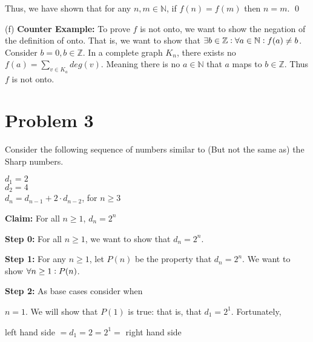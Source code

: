 \documentclass{article}
\begin{document}
Thus, we have shown that for any $n,m\in\mathbb{N}$, if $f(n)=f(m)$ then $n=m$. \qed\vspace{15pt}

(f)
\textbf{Counter Example:} To prove $f$ is not onto, we want to show the negation of the definition of onto. That is, we want to show that $\exists b\in\mathbb{Z}\vcentcolon \forall a\in\mathbb{N}\vcentcolon f(a)\neq b$. Consider $b=0,b\in\mathbb{Z}$.  In a complete graph $K_n$, there exists no $f(a)=\sum_{v\in K_a} deg(v)$.  Meaning there is no $a\in\mathbb{N}$ that $a$ maps to $b\in\mathbb{Z}$.  Thus $f$ is not onto. \vspace{10pt} 





\pagebreak

\section{Problem 3}
\noindent Consider the following sequence of numbers similar to (But not the same as) the Sharp numbers.
\begin{center}
	\begin{minipage}{0.5\textwidth}
		$d_1=2$ \\
		$d_2=4$ \\
		$d_n=d_{n-1}+2\cdot d_{n-2}$, for $n\geq 3$ \\
	\end{minipage}
\end{center}

\vspace{10pt}

\noindent\textbf{Claim:} For all $n\geq 1$, $d_n=2^n$\vspace{20pt}


\noindent\textbf{Step 0:} For all $n\geq 1$, we want to show that $d_n=2^n$.\vspace{15pt}

\noindent\textbf{Step 1:} For any $n\geq 1$, let $P(n)$ be the property that $d_n=2^n$. We want to show $\forall n\geq 1\vcentcolon P(n)$. \vspace{15pt}

\noindent\textbf{Step 2:} As base cases consider when\vspace{7pt}

$n=1$. We will show that $P(1)$ is true: that is, that $d_1=2^1$. Fortunately,

\begin{center}
	left hand side $=d_1=2=2^1=$ right hand side \\ 
\end{center}
\end{document}
